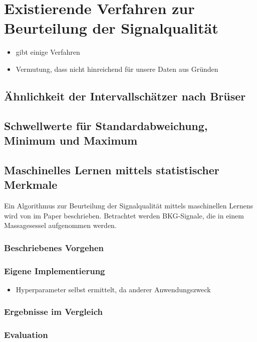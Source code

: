 \chapter{Existierende Verfahren zur Beurteilung der Signalqualität}\label{existierende}

\begin{itemize}
	\item gibt einige Verfahren
	\item Vermutung, dass nicht hinreichend für unsere Daten	 aus Gründen
\end{itemize}

\section{Ähnlichkeit der Intervallschätzer nach Brüser}

\section{Schwellwerte für Standardabweichung, Minimum und Maximum}

\section{Maschinelles Lernen mittels statistischer Merkmale}

Ein Algorithmus zur Beurteilung der Signalqualität mittels maschinellen Lernens wird von \citeauthor{Sadek2016} im Paper  beschrieben. Betrachtet werden \ac{BKG}-Signale, die in einem Massagesessel aufgenommen werden.

\subsection{Beschriebenes Vorgehen}

\subsection{Eigene Implementierung}

\begin{itemize}
	\item Hyperparameter selbst ermittelt, da anderer Anwendungszweck
\end{itemize}

\subsection{Ergebnisse im Vergleich}

\subsection{Evaluation}


